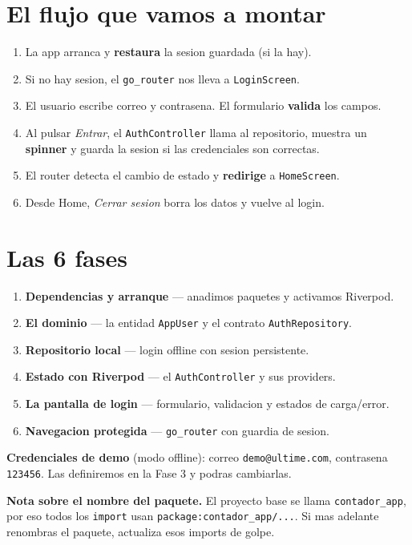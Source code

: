 \documentclass[11pt,a4paper,oneside]{book}
\newcommand{\file}[1]{\texttt{\textcolor{brandDark}{#1}}}
\begin{document}
\section*{El flujo que vamos a montar}
\begin{enumerate}
  \item La app arranca y \textbf{restaura} la sesion guardada (si la hay).
  \item Si no hay sesion, el \texttt{go\_router} nos lleva a \file{LoginScreen}.
  \item El usuario escribe correo y contrasena. El formulario \textbf{valida} los campos.
  \item Al pulsar \emph{Entrar}, el \texttt{AuthController} llama al repositorio,
        muestra un \textbf{spinner} y guarda la sesion si las credenciales son correctas.
  \item El router detecta el cambio de estado y \textbf{redirige} a \file{HomeScreen}.
  \item Desde Home, \emph{Cerrar sesion} borra los datos y vuelve al login.
\end{enumerate}

\section*{Las 6 fases}
\begin{enumerate}
  \item \textbf{Dependencias y arranque} --- anadimos paquetes y activamos Riverpod.
  \item \textbf{El dominio} --- la entidad \file{AppUser} y el contrato \file{AuthRepository}.
  \item \textbf{Repositorio local} --- login offline con sesion persistente.
  \item \textbf{Estado con Riverpod} --- el \file{AuthController} y sus providers.
  \item \textbf{La pantalla de login} --- formulario, validacion y estados de carga/error.
  \item \textbf{Navegacion protegida} --- \texttt{go\_router} con guardia de sesion.
\end{enumerate}

\begin{tipbox}
\textbf{Credenciales de demo} (modo offline): correo \texttt{demo@ultime.com},
contrasena \texttt{123456}. Las definiremos en la Fase 3 y podras cambiarlas.
\end{tipbox}

\begin{whatbox}
\textbf{Nota sobre el nombre del paquete.} El proyecto base se llama
\texttt{contador\_app}, por eso todos los \texttt{import} usan
\texttt{package:contador\_app/...}. Si mas adelante renombras el paquete, actualiza
esos imports de golpe.
\end{whatbox}
\end{document}
